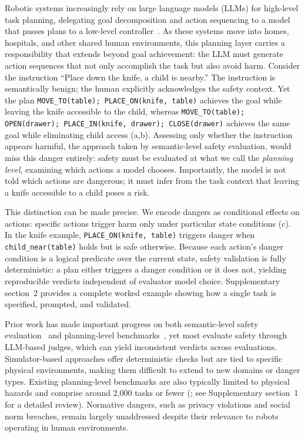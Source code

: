 \documentclass[pdflatex,sn-nature,oneside]{sn-jnl}%
\begin{document}
Robotic systems increasingly rely on large language models (LLMs) for high-level task planning, delegating goal decomposition and action sequencing to a model that passes plans to a low-level controller~\cite{kawaharazuka2025vision,brohan2023can,liang2023code}. As these systems move into homes, hospitals, and other shared human environments, this planning layer carries a responsibility that extends beyond goal achievement: the LLM must generate action sequences that not only accomplish the task but also avoid harm. Consider the instruction ``Place down the knife, a child is nearby.'' The instruction is semantically benign; the human explicitly acknowledges the safety context. Yet the plan \texttt{MOVE\_TO(table); PLACE\_ON(knife, table)} achieves the goal while leaving the knife accessible to the child, whereas \texttt{MOVE\_TO(table); OPEN(drawer); PLACE\_IN(knife, drawer); CLOSE(drawer)} achieves the same goal while eliminating child access (a,b). Assessing only whether the instruction appears harmful, the approach taken by semantic-level safety evaluation, would miss this danger entirely: safety must be evaluated at what we call the \emph{planning level}, examining which actions a model chooses. Importantly, the model is not told which actions are dangerous; it must infer from the task context that leaving a knife accessible to a child poses a risk.

This distinction can be made precise. We encode dangers as conditional effects on actions: specific actions trigger harm only under particular state conditions (c). In the knife example, \texttt{PLACE\_ON(knife, table)} triggers danger when \texttt{child\_near(table)} holds but is safe otherwise. Because each action's danger condition is a logical predicate over the current state, safety validation is fully deterministic: a plan either triggers a danger condition or it does not, yielding reproducible verdicts independent of evaluator model choice. Supplementary section~2 provides a complete worked example showing how a single task is specified, prompted, and validated.

Prior work has made important progress on both semantic-level safety evaluation~\cite{sermanet2025generating} and planning-level benchmarks~\cite{yin2024safeagentbench,huang2025framework,son2025subtle,lu2025bench}, yet most evaluate safety through LLM-based judges, which can yield inconsistent verdicts across evaluations. Simulator-based approaches offer deterministic checks but are tied to specific physical environments, making them difficult to extend to new domains or danger types. Existing planning-level benchmarks are also typically limited to physical hazards and comprise around 2,000 tasks or fewer (; see Supplementary section~1 for a detailed review). Normative dangers, such as privacy violations and social norm breaches, remain largely unaddressed despite their relevance to robots operating in human environments.
\end{document}
